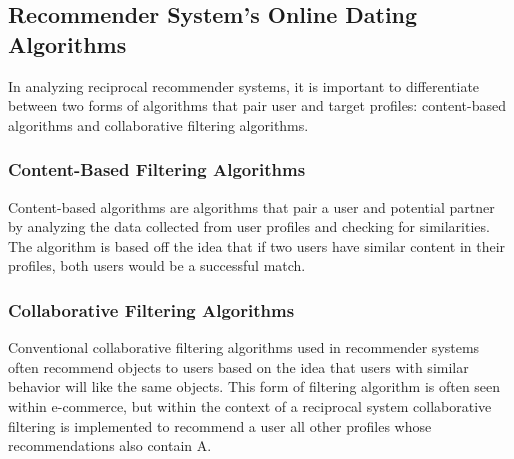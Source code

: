 \documentclass[11pt]{article}
\begin{document}
\subsection{Recommender System's Online Dating Algorithms}

In analyzing reciprocal recommender systems, it is important to differentiate between two forms of algorithms that pair user and target profiles: content-based algorithms and collaborative filtering algorithms.

\subsubsection{Content-Based Filtering Algorithms}
 Content-based algorithms are algorithms that pair a user and potential partner by analyzing the data collected from user profiles and checking for similarities. The algorithm is based off the idea that if two users have similar content in their profiles, both users would be a successful match. 
 

\subsubsection{Collaborative Filtering Algorithms}
Conventional collaborative filtering algorithms used in recommender systems often recommend objects to users based on the idea that users with similar behavior will like the same objects. This form of filtering algorithm is often seen within e-commerce, but within the context of a reciprocal system collaborative filtering is implemented to recommend a user all other profiles whose recommendations also contain A.

\pagebreak
\end{document}
